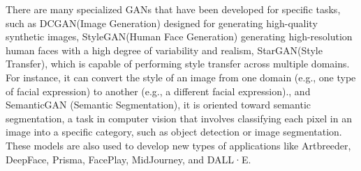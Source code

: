 \noindent
There are many specialized GANs that have been developed for specific tasks, such as DCGAN(Image Generation) designed for generating high-quality synthetic images, StyleGAN(Human Face Generation) generating high-resolution human faces with a high degree of variability and realism, StarGAN(Style Transfer)\cite{StarGAN}, which is capable of performing style transfer across multiple domains. For instance, it can convert the style of an image from one domain (e.g., one type of facial expression) to another (e.g., a different facial expression)., and SemanticGAN (Semantic Segmentation)\cite{SemanticGAN}, it is oriented toward semantic segmentation, a task in computer vision that involves classifying each pixel in an image into a specific category, such as object detection or image segmentation. These models are also used to develop new types of applications like Artbreeder, DeepFace, Prisma, FacePlay, MidJourney, and DALL·E.